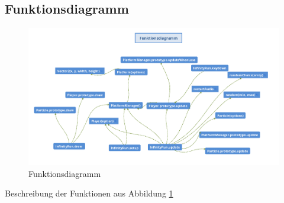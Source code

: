 \subsection{Funktionsdiagramm}
\begin{landscape}
	\begin{figure}%
		\centering
		\includegraphics[scale=0.5]{content/pictures/funktionsdiagramm.png}
		\caption{Funktionsdiagramm}
		\label{pic:diagramm}
	\end{figure}
\end{landscape}
Beschreibung der Funktionen aus Abbildung \ref{pic:diagramm}
